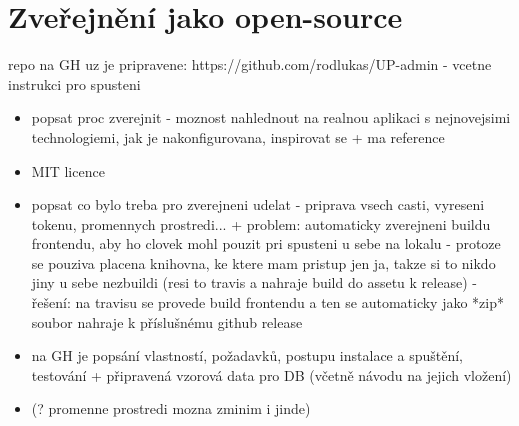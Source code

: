 \chapter{Zveřejnění jako open-source}
repo na GH uz je pripravene: https://github.com/rodlukas/UP-admin - vcetne instrukci pro spusteni
\begin{itemize}
\item popsat proc zverejnit - moznost nahlednout na realnou aplikaci s nejnovejsimi technologiemi, jak je nakonfigurovana, inspirovat se + ma reference
\item MIT licence
\item popsat co bylo treba pro zverejneni udelat - priprava vsech casti, vyreseni tokenu, promennych prostredi... + problem: automaticky zverejneni buildu frontendu, aby ho clovek mohl pouzit pri spusteni u sebe na lokalu - protoze se pouziva placena knihovna, ke ktere mam pristup jen ja, takze si to nikdo jiny u sebe nezbuildi (resi to travis a nahraje build do assetu k release) - řešení: na travisu se provede build frontendu a ten se automaticky jako *zip* soubor nahraje k příslušnému github release 
\item na GH  je popsání vlastností, požadavků, postupu instalace a spuštění, testování + připravená vzorová data pro DB (včetně návodu na jejich vložení)
\item (? promenne prostredi mozna zminim i jinde)
\end{itemize}



